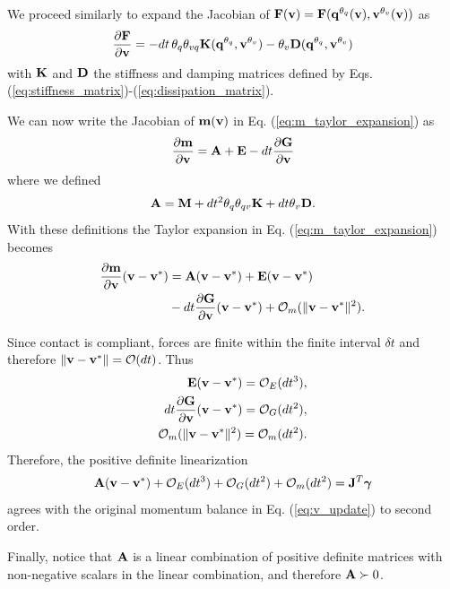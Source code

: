 We proceed similarly to expand the Jacobian of
${\mathbf{F}}({\mathbf{v}})={\mathbf{F}}({\mathbf{q}}^{\theta_{q}}({\mathbf{v}}), {\mathbf{v}}^{\theta_v}({\mathbf{v}}))$
as
\begin{align*}
	\frac{\partial{\mathbf{F}}}{\partial {\mathbf{v}}} = -dt\,\theta_q\theta_{vq}{\mathbf{K}}({\mathbf{q}}^{\theta_q},
	{\mathbf{v}}^{\theta_v})-\theta_v{\mathbf{D}}({\mathbf{q}}^{\theta_q}, {\mathbf{v}}^{\theta_v})
\end{align*}
with ${\mathbf{K}}$ and ${\mathbf{D}}$ the stiffness and damping matrices defined by Eqs.
(\ref{eq:stiffness_matrix})-(\ref{eq:dissipation_matrix}).

We can now write the Jacobian of ${\mathbf{m}}({\mathbf{v}})$ in Eq.
(\ref{eq:m_taylor_expansion}) as
\begin{align*}
	\frac{\partial {\mathbf{m}}}{\partial {\mathbf{v}}} = {\mathbf{A}} + {\mathbf{E}} - dt\frac{\partial {\mathbf{G}}}{\partial {\mathbf{v}}}
\end{align*}
where we defined
\begin{align*}
	{\mathbf{A}}={\mathbf{M}}+ dt^2\theta_q\theta_{qv}{\mathbf{K}}+dt\theta_v{\mathbf{D}}.
\end{align*}
With these definitions the Taylor expansion in Eq. (\ref{eq:m_taylor_expansion})
becomes
\begin{align*}
	\frac{\partial{\mathbf{m}}}{\partial{\mathbf{v}}}({\mathbf{v}}-{\mathbf{v}}^*) &= {\mathbf{A}}({\mathbf{v}}-{\mathbf{v}}^*) + {\mathbf{E}}({\mathbf{v}}-{\mathbf{v}}^*) \\
	&- dt\frac{\partial{\mathbf{G}}}{\partial{\mathbf{v}}}({\mathbf{v}}-{\mathbf{v}}^*) + \mathcal{O}_m(\Vert{\mathbf{v}}-{\mathbf{v}}^*\Vert^2).
\end{align*}

Since contact is compliant, forces are finite within the finite interval $\delta
t$ and therefore $\Vert{\mathbf{v}}-{\mathbf{v}}^*\Vert=\mathcal{O}(dt)$. Thus
\begin{align*}
	{\mathbf{E}}({\mathbf{v}}-{\mathbf{v}}^*)=\mathcal{O}_E(dt^3), \\
    dt\frac{\partial {\mathbf{G}}}{\partial {\mathbf{v}}}({\mathbf{v}}-{\mathbf{v}}^*)=\mathcal{O}_G(dt^2), \\ 
    \mathcal{O}_m(\Vert{\mathbf{v}}-{\mathbf{v}}^*\Vert^2) = \mathcal{O}_m(dt^2).
\end{align*}
Therefore, the positive definite linearization
\begin{align*}
	{\mathbf{A}}({\mathbf{v}}-{\mathbf{v}}^*) + \mathcal{O}_E(dt^3) + \mathcal{O}_G(dt^2) +
	\mathcal{O}_m(dt^2) = {\mathbf{J}}^T{\mathbf{{\bm\gamma}}}
\end{align*}
agrees with the original momentum balance in Eq. (\ref{eq:v_update}) to second
order.

Finally, notice that ${\mathbf{A}}$ is a linear combination of positive definite
matrices with non-negative scalars in the linear combination, and therefore
${\mathbf{A}}\succ 0$.\hfill\IEEEQED

